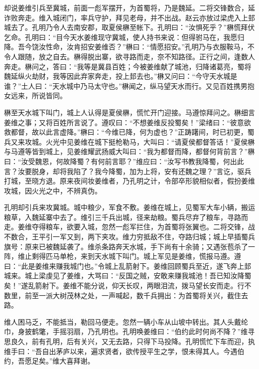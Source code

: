 却说姜维引兵至冀城，前面一彪军摆开，为首蜀将，乃是魏延。二将交锋数合，延诈败奔走。维入城闭门，率兵守护，拜见老母，并不出战。赵云亦放过梁虎入上邽城去了。孔明乃令人去南安郡，取夏侯楙至帐下。孔明曰：“汝惧死乎？”楙慌拜伏乞命。孔明曰：“目今天水姜维现守冀城，使人持书来说：但得驸马在，我愿归降。吾今饶汝性命，汝肯招安姜维否？”楙曰：“情愿招安。”孔明乃与衣服鞍马，不令人跟随，放之自去。楙得脱出寨，欲寻路而走，奈不知路径。正行之间，逢数人奔走。楙问之，答曰：“我等是冀县百姓；今被姜维献了城池，归降诸葛亮，蜀将魏延纵火劫财，我等因此弃家奔走，投上邽去也。”楙又问曰：“今守天水城是谁？”土人曰：“天水城中乃马太守也。”楙闻之，纵马望天水而行。又见百姓携男抱女远来，所说皆同。

楙至天水城下叫门，城上人认得是夏侯楙，慌忙开门迎接。马遵惊拜问之。楙细言姜维之事；又将百姓所言说了。遵叹曰：“不想姜维反投蜀矣！”梁绪曰：“彼意欲救都督，故以此言虚降。”楙曰：“今维已降，何为虚也？”正踌躇间，时已初更，蜀兵又来攻城。火光中见姜维在城下挺枪勒马，大叫曰：“请夏侯都督答话！”夏侯楙与马遵等皆到城上，见姜维耀武扬威大叫曰：“我为都督而降，都督何背前言？”楙曰：“汝受魏恩，何故降蜀？有何前言耶？”维应曰：“汝写书教我降蜀，何出此言？汝要脱身，却将我陷了？我今降蜀，加为上将，安有还魏之理？”言讫，驱兵打城，至晓方退。原来夜间妆姜维者，乃孔明之计，令部卒形貌相似者，假扮姜维攻城，因火光之中，不辨真伪。

孔明却引兵来攻冀城。城中粮少，军食不敷。姜维在城上，见蜀军大车小辆，搬运粮草，入魏延寨中去了。维引三千兵出城，径来劫粮。蜀兵尽弃了粮车，寻路而走。姜维夺得粮车，欲要入城，忽然一彪军拦住，为首蜀将张翼也。二将交锋，战不数合，王平引一军又到，两下夹攻。维力穷抵敌不住，夺路归城；城上早插蜀兵旗号：原来已被魏延袭了。维杀条路奔天水城，手下尚有十余骑；又遇张苞杀了一阵，维止剩得匹马单枪，来到天水城下叫门。城上军见是姜维，慌报马遵。遵曰：“此是姜维来赚我城门也。”令城上乱箭射下。姜维回顾蜀兵至近，遂飞奔上邽城来。城上梁虔见了姜维，大骂曰：“反国之贼，安敢来赚我城池！吾已知汝降蜀矣！”遂乱箭射下。姜维不能分说，仰天长叹，两眼泪流，拨马望长安而走。行不数里，前至一派大树茂林之处，一声喊起，数千兵拥出：为首蜀将关兴，截住去路。

维人困马乏，不能抵当，勒回马便走。忽然一辆小车从山坡中转出。其人头戴纶巾，身披鹤氅，手摇羽扇，乃孔明也。孔明唤姜维曰：“伯约此时何尚不降？”维寻思良久，前有孔明，后有关兴，又无去路，只得下马投降。孔明慌忙下车而迎，执维手曰：“吾自出茅庐以来，遍求贤者，欲传授平生之学，恨未得其人。今遇伯约，吾愿足矣。”维大喜拜谢。


